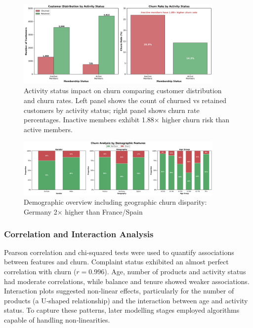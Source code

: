 \documentclass[12pt]{article}
\begin{document}
\begin{figure}[H]
\centering
\includegraphics[width=0.9\textwidth]{img/05_active_member_impact_grouped.png}
\caption{Activity status impact on churn comparing customer distribution and churn rates. Left panel shows the count of churned vs retained customers by activity status; right panel shows churn rate percentages. Inactive members exhibit 1.88× higher churn risk than active members.}
\label{fig:active}
\end{figure}

\begin{figure}[H]
\centering
\includegraphics[width=0.9\textwidth]{img/02_demographic_overview.png}
\caption{Demographic overview including geographic churn disparity: Germany 2× higher than France/Spain}
\label{fig:geography}
\end{figure}

\subsubsection{Correlation and Interaction Analysis}
Pearson correlation and chi‑squared tests were used to quantify associations between features and churn.  Complaint status exhibited an almost perfect correlation with churn (\(r=0.996\)).  Age, number of products and activity status had moderate correlations, while balance and tenure showed weaker associations.  Interaction plots suggested non‑linear effects, particularly for the number of products (a U‑shaped relationship) and the interaction between age and activity status.  To capture these patterns, later modelling stages employed algorithms capable of handling non‑linearities.
\end{document}
